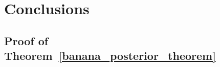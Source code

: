 \documentclass[english,twoside,openright]{HYgraduMLDS}
\begin{document}
\chapter{Conclusions}

\cleardoublepage %



\begin{appendices}
\myappendixtitle

\chapter{Proof of Theorem~\ref{banana_posterior_theorem}}\label{banana_posterior_theorem_proof}


\end{appendices}
\end{document}
